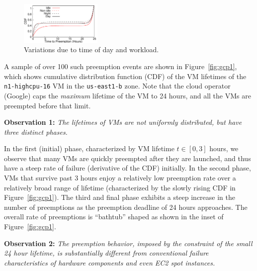 \begin{figure}
  \centering 
  \includegraphics[width=0.35\textwidth]{../gnuplot_analysis/time-breakdown.pdf}
      \vspace*{\myfigspace}
  \caption{Variations due to time of day and workload.}
  \label{fig:time-breakdown}
    \vspace*{\myfigspace}
\end{figure}



A sample of over 100 such preemption events are shown in Figure~\ref{fig:gcp1}, which shows cumulative distribution function (CDF) of the VM lifetimes of the \texttt{n1-highcpu-16} VM in the \texttt{us-east1-b} zone. 
Note that the cloud operator (Google) caps the \emph{maximum} lifetime of the VM to 24 hours, and all the VMs are preempted before that limit. 

\noindent \textbf{Observation 1:} \emph{The lifetimes of VMs are not uniformly distributed, but have three distinct phases.}

\noindent In the first (initial) phase, characterized by VM lifetime $t\in [0, 3]$ hours, we observe that many VMs are quickly preempted after they are launched, and thus have a steep rate of failure (derivative of the CDF) initially.
In the second phase, VMs that survive past 3 hours enjoy a relatively low preemption rate over a relatively broad range of lifetime (characterized by the slowly rising CDF in Figure~\ref{fig:gcp1}).
The third and final phase exhibits a steep increase in the number of preemptions as the preemption deadline of 24 hours approaches.
The overall rate of preemptions is ``bathtub'' shaped as shown in the inset of Figure~\ref{fig:gcp1}.



\noindent \textbf{Observation 2:} \emph{The preemption behavior, imposed by the constraint of the small 24 hour  lifetime, is substantially different from conventional failure characteristics of hardware components and even EC2 spot instances.}

